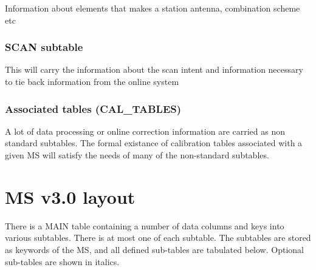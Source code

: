 \documentclass{article}
\begin{document}
Information about elements that makes a station antenna, combination scheme etc


\subsubsection{SCAN subtable}

This will carry the information about the scan intent and information
necessary to tie back information from the online system




\subsubsection{Associated tables (CAL\_TABLES)}

A lot of data processing or online correction information are carried as
non standard subtables. The formal existance of calibration tables associated with a given MS will 
satisfy the needs of many of the non-standard subtables.



\section{MS v3.0 layout}

There is a MAIN table containing a number of data columns and keys
into various subtables. There is at most one of each subtable. The
subtables are stored as keywords of the MS, and all defined sub-tables
are tabulated below.  Optional sub-tables are shown in italics.
\end{document}

